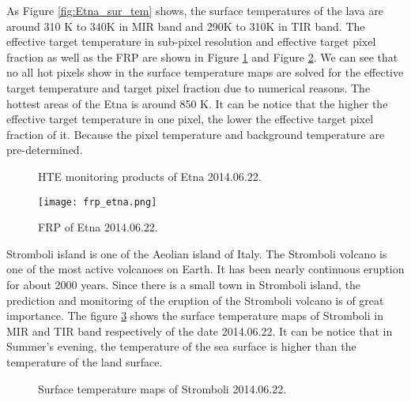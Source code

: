\noindent As Figure \ref{fig:Etna_sur_tem} shows, the surface temperatures of the lava are around 310 K to 340K in MIR band and 290K to 310K in TIR band. The effective target temperature in sub-pixel resolution and effective target pixel fraction as well as the FRP are shown in Figure \ref{fig:Etna_HTE} and Figure \ref{fig:Etna_frp}. We can see that no all hot pixels show in the surface temperature maps are solved for the effective target temperature and target pixel fraction due to numerical reasons. The hottest areas of the Etna is around 850 K. It can be notice that the higher the effective target temperature in one pixel, the lower the effective target pixel fraction of it. Because the pixel temperature and background temperature are pre-determined.\\

\begin{figure}[!htbp]
\centering
{}
\hspace{0.1in}
\caption{HTE monitoring products of Etna 2014.06.22.}
\label{fig:Etna_HTE}
\end{figure}

\begin{figure}[!htbp]
\centering
\texttt{[image: frp\_etna.png]}
\caption{FRP of Etna 2014.06.22.}
\label{fig:Etna_frp}
\end{figure}

\noindent Stromboli island is one of the Aeolian island of Italy. The Stromboli volcano is one of the most active volcanoes on Earth. It has been nearly continuous eruption for about 2000 years. Since there is a small town in Stromboli island, the prediction and monitoring of the eruption of the Stromboli volcano is of great importance. The figure \ref{fig:Strom_sur_tem} shows the surface temperature maps of Stromboli in MIR and TIR band respectively of the date 2014.06.22. It can be notice that in Summer's evening, the temperature of the sea surface is higher than the temperature of the land surface.\\

\begin{figure}
\centering
{}
\hspace{0.1in}
\caption{Surface temperature maps of Stromboli 2014.06.22.}
\label{fig:Strom_sur_tem}
\end{figure}

